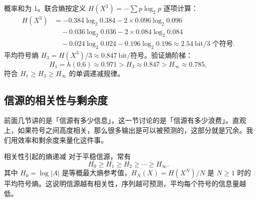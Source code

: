 \begin{example}
概率和为 1。联合熵按定义 $H(X^3)=-\sum p\log_2 p$ 逐项计算：
\begin{align*}
H(X^3) &= -0.384\log_2 0.384
         -2\times0.096\log_2 0.096  \\
        &\quad -0.036\log_2 0.036
         -2\times0.084\log_2 0.084  \\
        &\quad -0.024\log_2 0.024
         -0.196\log_2 0.196          \approx 2.54\ \text{bit/3 个符号}.
\end{align*}
平均符号熵 $H_3=H(X^3)/3\approx 0.847\ \text{bit/符号}$。验证熵阶梯：
\[
H_1=h(0.6)\approx 0.971 > H_3\approx 0.847 > H_\infty\approx 0.785,
\]
符合 $H_1\ge H_3\ge H_\infty$ 的单调递减规律。
\end{example}

\subsection{信源的相关性与剩余度}

前面几节讲的是「信源有多少信息」，这一节讨论的是「信源有多少浪费」。直观上，如果符号之间高度相关，那么很多输出是可以被预测的，这部分就是冗余。我们用效率和剩余度来量化这件事。

\begin{formulaBox}{相关性引起的熵递减}
对于平稳信源，常有
\[
 H_0\ge H_1\ge H_2\ge\cdots\ge H_\infty.
\]
其中 $H_0=\log |A|$ 是等概最大熵参考值，$H_N(X)=H(X^N)/N$ 是 $N\ge1$ 时的平均符号熵。这说明信源越有相关性，序列越可预测，平均每个符号的信息量越低。
\end{formulaBox}

